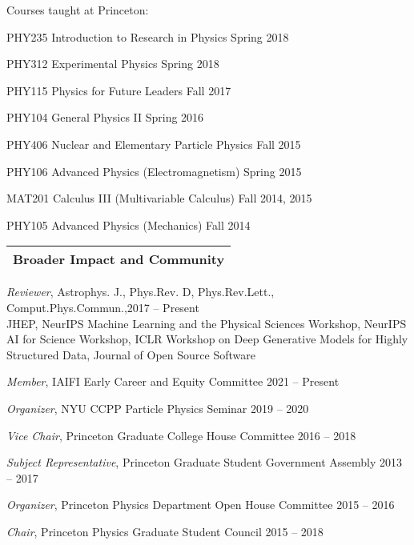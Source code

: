 \documentclass[letterpaper,11pt]{article}
\newenvironment{packed_itemize}{
\begin{itemize}[label=\raisebox{0.25ex}{\tiny$\bullet$}]
  \setlength{\itemsep}{3.9pt}
  \setlength{\parskip}{0pt}
  \setlength{\parsep}{0pt}}{\end{itemize}
}
\begin{document}
\noindent
Courses taught at Princeton:
\begin{packed_itemize}
  \item PHY235 Introduction to Research in Physics \hfill Spring 2018
  \item PHY312 Experimental Physics \hfill Spring 2018
  \item PHY115  Physics for Future Leaders \hfill Fall 2017
  \item PHY104  General Physics II \hfill Spring 2016
  \item PHY406 Nuclear and Elementary Particle Physics \hfill Fall 2015
  \item PHY106 Advanced Physics (Electromagnetism) \hfill Spring 2015
  \item MAT201 Calculus III (Multivariable Calculus) \hfill Fall 2014, 2015
  \item PHY105 Advanced Physics (Mechanics) \hfill Fall 2014
\end{packed_itemize}
\vspace{2.0mm}


 
\noindent
\begin{tabular*}{\textwidth}{l@{\extracolsep{\fill}}}
\large {\sc \Large{Broader Impact and Community}}\\
\hline
\end{tabular*}\vspace{1.mm}

\begin{packed_itemize}
  \item \emph{Reviewer}, Astrophys. J., Phys.Rev. {D}, Phys.Rev.Lett., Comput.Phys.Commun.,\hfill 2017 -- Present \\ JHEP, NeurIPS Machine Learning and the Physical Sciences Workshop, NeurIPS \\ AI for Science Workshop, ICLR Workshop on Deep Generative Models for Highly \\ Structured Data, Journal of Open Source Software
  \item \emph{Member}, IAIFI Early Career and Equity Committee  \hfill 2021 -- Present
  \item \emph{Organizer}, NYU CCPP Particle Physics Seminar \hfill 2019 -- 2020
  \item \emph{Vice Chair}, Princeton Graduate College House Committee \hfill 2016 -- 2018
  \item \emph{Subject Representative}, Princeton Graduate Student Government Assembly \hfill 2013 -- 2017
  \item \emph{Organizer}, Princeton Physics Department Open House Committee  \hfill 2015 -- 2016
  \item \emph{Chair}, Princeton Physics Graduate Student Council \hfill 2015 -- 2018
\end{packed_itemize}
\vspace{2.0mm}
\end{document}
